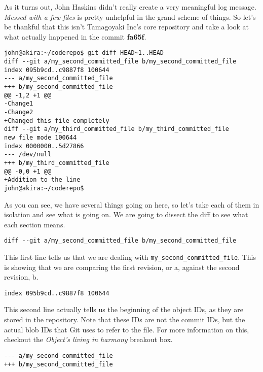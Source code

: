 As it turns out, John Haskins didn't really create a very meaningful log message.  \emph{Messed with a few files} is pretty unhelpful in the grand scheme of things.  So let's be thankful that this isn't Tamagoyaki Inc's core repository and take a look at what actually happened in the commit \textbf{fa65f}.

\begin{Verbatim}[frame=leftline,framerule=1mm,fontsize=\relsize{-3}] 
john@akira:~/coderepo$ git diff HEAD~1..HEAD
diff --git a/my_second_committed_file b/my_second_committed_file
index 095b9cd..c9887f8 100644
--- a/my_second_committed_file
+++ b/my_second_committed_file
@@ -1,2 +1 @@
-Change1
-Change2
+Changed this file completely
diff --git a/my_third_committed_file b/my_third_committed_file
new file mode 100644
index 0000000..5d27866
--- /dev/null
+++ b/my_third_committed_file
@@ -0,0 +1 @@
+Addition to the line
john@akira:~/coderepo$ 
\end{Verbatim}

As you can see, we have several things going on here, so let's take each of them in isolation and see what is going on.  We are going to dissect the diff to see what each section means.

\begin{Verbatim}[frame=leftline,framerule=1mm,fontsize=\relsize{-3}] 
diff --git a/my_second_committed_file b/my_second_committed_file
\end{Verbatim}

This first line tells us that we are dealing with \texttt{my\_second\_committed\_file}.  This is showing that we are comparing the first revision, or a, against the second revision, b.

\begin{Verbatim}[frame=leftline,framerule=1mm,fontsize=\relsize{-3}] 
index 095b9cd..c9887f8 100644
\end{Verbatim}

This second line actually tells us the beginning of the object IDs, as they are stored in the repository.  Note that these IDs are not the commit IDs, but the actual blob IDs that Git uses to refer to the file.  For more information on this, checkout the \emph{Object's living in harmony} breakout box.

\begin{Verbatim}[frame=leftline,framerule=1mm,fontsize=\relsize{-3}] 
--- a/my_second_committed_file
+++ b/my_second_committed_file
\end{Verbatim}

